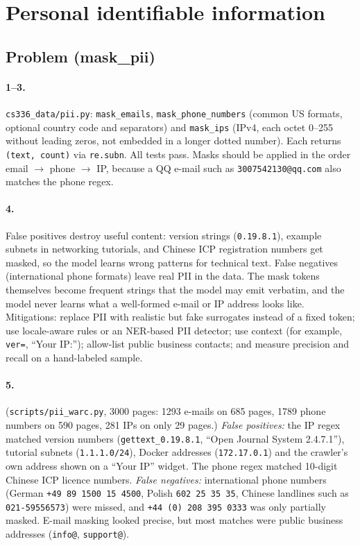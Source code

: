 \documentclass[11pt]{article}
\begin{document}
\section{Personal identifiable information}

\subsection*{Problem (mask\_pii)}

\paragraph{1--3.} \texttt{cs336\_data/pii.py}: \texttt{mask\_emails}, \texttt{mask\_phone\_numbers}
(common US formats, optional country code and separators) and \texttt{mask\_ips} (IPv4, each octet
0--255 without leading zeros, not embedded in a longer dotted number). Each returns
\texttt{(text, count)} via \texttt{re.subn}. All tests pass. Masks should be applied in the order
email $\rightarrow$ phone $\rightarrow$ IP, because a QQ e-mail such as \texttt{3007542130@qq.com}
also matches the phone regex.

\paragraph{4.}
False positives destroy useful content: version strings (\texttt{0.19.8.1}), example subnets in
networking tutorials, and Chinese ICP registration numbers get masked, so the model learns
wrong patterns for technical text. False negatives (international phone formats) leave real
PII in the data. The mask tokens themselves become frequent strings that the model may emit
verbatim, and the model never learns what a well-formed e-mail or IP address looks like. Mitigations:
replace PII with realistic but fake surrogates instead of a fixed token; use locale-aware
rules or an NER-based PII detector; use context (for example, \texttt{ver=}, ``Your IP:'');
allow-list public business contacts; and measure precision and recall on a hand-labeled sample.

\paragraph{5.} (\texttt{scripts/pii\_warc.py}, 3000 pages: 1293 e-mails on 685 pages, 1789 phone
numbers on 590 pages, 281 IPs on only 29 pages.)
\emph{False positives:} the IP regex matched version numbers (\texttt{gettext\_0.19.8.1},
``Open Journal System 2.4.7.1''), tutorial subnets (\texttt{1.1.1.0/24}), Docker addresses
(\texttt{172.17.0.1}) and the crawler's own address shown on a ``Your IP'' widget. The
phone regex matched 10-digit Chinese ICP licence numbers.
\emph{False negatives:} international phone numbers (German \texttt{+49 89 1500 15 4500}, Polish
\texttt{602 25 35 35}, Chinese landlines such as \texttt{021-59556573}) were missed, and
\texttt{+44 (0) 208 395 0333} was only partially masked. E-mail masking looked precise, but
most matches were public business addresses (\texttt{info@}, \texttt{support@}).
\end{document}
